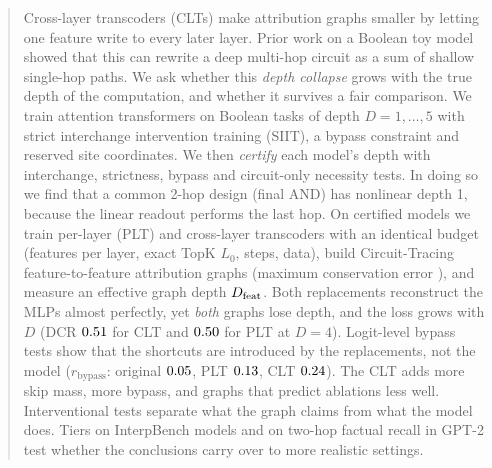 \begin{abstract}
Cross-layer transcoders (CLTs) make attribution graphs smaller by letting one feature write to every later layer. Prior work on a Boolean toy model showed that this can rewrite a deep multi-hop circuit as a sum of shallow single-hop paths. We ask whether this \emph{depth collapse} grows with the true depth of the computation, and whether it survives a fair comparison. We train attention transformers on Boolean tasks of depth $D=1,\dots,5$ with strict interchange intervention training (SIIT), a bypass constraint and reserved site coordinates. We then \emph{certify} each model's depth with interchange, strictness, bypass and circuit-only necessity tests. In doing so we find that a common 2-hop design (final AND) has nonlinear depth 1, because the linear readout performs the last hop. On \NCertified{} certified models we train per-layer (PLT) and cross-layer transcoders with an identical budget (features per layer, exact TopK $L_0$, steps, data), build Circuit-Tracing feature-to-feature attribution graphs (maximum conservation error \MaxConservationErr{}), and measure an effective graph depth $\Dfeat$. Both replacements reconstruct the MLPs almost perfectly, yet \emph{both} graphs lose depth, and the loss grows with $D$ (DCR $\DCRCLTDFour$ for CLT and $\DCRPLTDFour$ for PLT at $D=4$). Logit-level bypass tests show that the shortcuts are introduced by the replacements, not the model ($r_\mathrm{bypass}$: original $\RbypassAllOrig$, PLT $\RbypassAllPLT$, CLT $\RbypassAllCLT$). The CLT adds more skip mass, more bypass, and graphs that predict ablations less well. %
Interventional tests separate what the graph claims from what the model does. Tiers on InterpBench models and on two-hop factual recall in GPT-2 test whether the conclusions carry over to more realistic settings.
\end{abstract}
